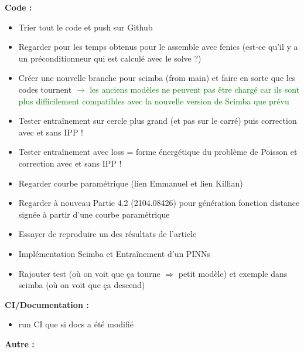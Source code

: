 \textbf{Code :}
\begin{itemize}[label=$\square$] 
	\item[\done] Trier tout le code et push sur Github
	\item Regarder pour les temps obtenus pour le assemble avec fenics (est-ce qu'il y a un préconditionneur qui est calculé avec le solve ?)
	\item[\done] Créer une nouvelle branche pour scimba (from main) et faire en sorte que les codes tournent  \textcolor{green}{$\rightarrow$ les anciens modèles ne peuvent pas être chargé car ils sont plus difficilement compatibles avec la nouvelle version de Scimba que prévu}
	\item Tester entraînement sur cercle plus grand (et pas sur le carré) puis correction avec et sans IPP !
	\item Tester entraînement avec loss = forme énergétique du problème de Poisson et correction avec et sans IPP !
	\item[\done] Regarder courbe paramétrique (lien Emmanuel et lien Killian)
	\item[\done] Regarder à nouveau Partie 4.2 (2104.08426) pour génération fonction distance signée à partir d'une courbe paramétrique
	\item[\done] Essayer de reproduire un des résultats de l'article
	\item Implémentation Scimba et Entraînement d'un PINNs
	\item Rajouter test (où on voit que ça tourne $\Rightarrow$ petit modèle) et exemple dans scimba (où on voit que ça descend)
\end{itemize}
\textbf{CI/Documentation :}
\begin{itemize}[label=$\square$] 
	\item[\done] run CI que si docs a été modifié
\end{itemize}
\textbf{Autre :}

